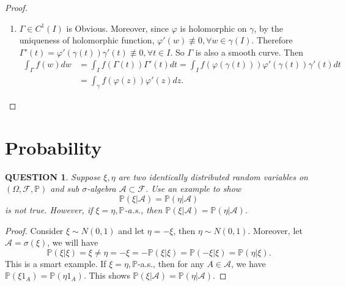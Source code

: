 \documentclass[12pt]{article}
\renewcommand{\(}{\left(}%
\renewcommand{\)}{\right)}%
\renewcommand{\[}{\left[}%
\renewcommand{\]}{\right]}%
\renewcommand{\a}{\mathscr{A}}
\newcommand{\p}{\mathbb{P}}
\newcommand{\f}{\mathscr{F}}
\newtheorem{question}{QUESTION}[section]}
\newtheorem{proof}{Proof.}}
\begin{document}
\begin{proof}
\begin{enumerate}
\begin{equation*}
\begin{split}
 				&\qquad\qquad -\sum_{k=1}^nf(\varphi(\gamma(t_{k-1})))\varphi'(\gamma(t_{k-1}))[\gamma(t_k)-\gamma(t_{k-1})]\Bigg|\\
 				= &\Bigg|\sum_{k=1}^nf(\varphi(\gamma(t_{k-1})))\int_{\gamma_{k-1}^k}\varphi'(z)dz\\
 				&\qquad\qquad -\sum_{k=1}^nf(\varphi(\gamma(t_{k-1})))\int_{\gamma_{k-1}^k}\varphi'(\gamma(t_{k-1}) )dz\Bigg|\\
 				\leq &\sum_{k=1}^nf(\varphi(\gamma(t_{k-1})))\int_{\gamma_{k-1}^k}|\varphi'(z)-\varphi'(\gamma(t_{k-1}))| ds\\
 				<&\varepsilon\sum_{k=1}^n|f(\varphi(\gamma(t_{k-1})))||\gamma_{k-1}^k|\\
 				\leq & \(\max_{z\in \Gamma}|f(z)||\gamma |\)\varepsilon. 
 			\end{split}
 		\end{equation*}
 		So we have obtained the desired result.
 		\item $\Gamma\in C^1(I)$ is Obvious. Moreover, since $\varphi$ is holomorphic on $\gamma$, by the uniqueness of holomorphic function, $\varphi'(w)\not\equiv 0,\forall w\in\gamma(I)$. Therefore $\Gamma'(t)=\varphi'(\gamma(t))\gamma'(t)\not\equiv 0,\forall t\in I$. So $\Gamma$ is also a smooth curve. Then
 	\begin{equation*}
 		\begin{split}
 			\int_\Gamma f(w)dw&=\int_I f(\Gamma(t))\Gamma'(t)dt=\int_If(\varphi(\gamma(t)))\varphi'(\gamma(t))\gamma'(t)dt\\
 			&=\int_\gamma f(\varphi(z))\varphi'(z)dz.
 		\end{split}
 	\end{equation*}
 	\end{enumerate}
 \end{proof}

  \section{Probability}
  \begin{question}
   Suppose $\xi,\eta$ are two identically distributed random variables on $(\Omega ,\f,\p )$ and sub $\sigma$-algebra $\a\subset\f$. Use an example to show
   \begin{equation*}
    \p(\xi|\a )=\p(\eta|\a )
   \end{equation*}
   is not true. However, if $\xi=\eta,\p$-a.s., then $\p(\xi|\a )=\p(\eta|\a )$.
  \end{question}
  \begin{proof}
   Consider $\xi\sim N(0,1)$ and let $\eta=-\xi$, then $\eta\sim N(0,1)$. Moreover, let $\a=\sigma(\xi)$, we will have
   \begin{equation*}
    \p(\xi|\xi )=\xi\neq\eta=-\xi=-\p(\xi|\xi)=\p(-\xi|\xi)=\p(\eta|\xi ).
   \end{equation*}
   This is a smart example. If $\xi=\eta,\p$-a.s., then for any $A\in\a$, we have $\p(\xi1_A)=\p(\eta1_A)$. This shows $\p(\xi|\a )=\p(\eta|\a )$.
  \end{proof}
\end{document}
